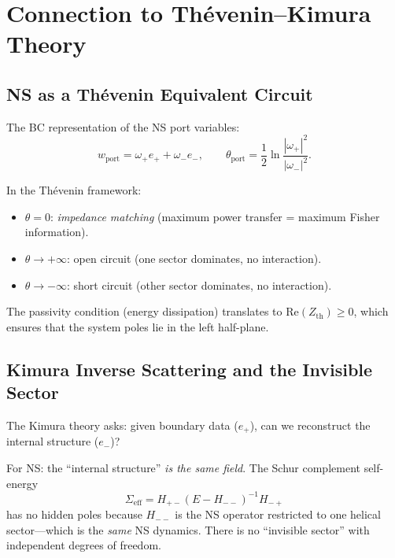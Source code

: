 \documentclass[12pt,a4paper]{article}
\theoremstyle{definition}
\begin{document}
\section{Connection to Th\'evenin--Kimura Theory}\label{sec:thev}

\subsection{NS as a Th\'evenin Equivalent Circuit}

The BC representation of the NS port variables:
\begin{equation}
  w_{\mathrm{port}} = \omega_+ e_+ + \omega_- e_- , \qquad
  \theta_{\mathrm{port}} = \frac{1}{2}\ln\frac{|\omega_+|^2}{|\omega_-|^2}.
\end{equation}

In the Th\'evenin framework:
\begin{itemize}
  \item $\theta = 0$: \emph{impedance matching} (maximum power transfer = maximum Fisher information).
  \item $\theta \to +\infty$: open circuit (one sector dominates, no interaction).
  \item $\theta \to -\infty$: short circuit (other sector dominates, no interaction).
\end{itemize}

The passivity condition (energy dissipation) translates to $\mathrm{Re}(Z_{\mathrm{th}}) \geq 0$, which ensures that the system poles lie in the left half-plane.

\subsection{Kimura Inverse Scattering and the Invisible Sector}

The Kimura theory asks: given boundary data ($e_+$), can we reconstruct the internal structure ($e_-$)?

For NS: the ``internal structure'' \emph{is the same field}. The Schur complement self-energy
\begin{equation}
  \Sigma_{\mathrm{eff}} = H_{+-}(E - H_{--})^{-1}H_{-+}
\end{equation}
has no hidden poles because $H_{--}$ is the NS operator restricted to one helical sector---which is the \emph{same} NS dynamics. There is no ``invisible sector'' with independent degrees of freedom.
\end{document}

